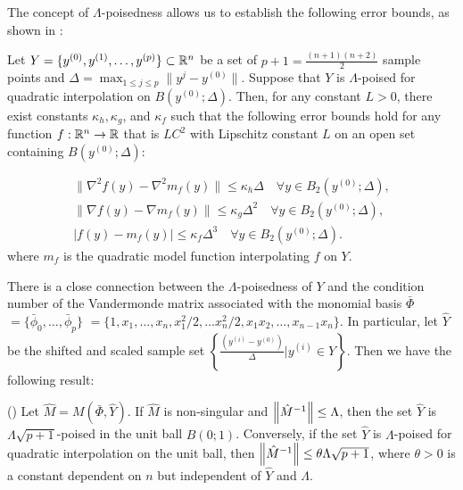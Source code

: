 The concept of $\Lambda$-poisedness allows us to establish the following error bounds, as shown in 
 \cite[Theorem 3.16]{introduction_book}:

\begin{theorem}
\label{quadratic_errors}  
Let $Y = \{y^{(0)}, y^{(1)}, \ldots, y^{(p)}\} \subset \mathbb R^n$ be a set of $p+1=\frac{(n+1)(n+2)}{2}$ sample points and $\Delta = \max_{1 \le j \le p} \|y^j-y^{(0)}\|$.  Suppose that $Y$ is $\Lambda$-poised for quadratic interpolation on $B(y^{(0)}; \Delta)$.    Then, for any constant $L > 0$, there exist constants $\kappa_{h}, \kappa_{g}$, and $\kappa_{f}$ such that the following error bounds hold for any function $f:\mathbb R^n \rightarrow \mathbb R$ that is $LC^2$ with Lipschitz constant $L$ on an open set containing $B(y^{(0)};\Delta)$:

\begin{align}
\|\nabla^2 f(y) - \nabla^2 m_f(y)\| \le \kappa_{h} \Delta \quad \forall y \in B_2(y^{(0)}; \Delta), \label{error_in_hessian}\\
\|\nabla f(y) - \nabla m_f(y)\| \le \kappa_{g} \Delta^2 \quad \forall y \in B_2(y^{(0)}; \Delta), \label{error_in_gradient} \\
|f(y) - m_f(y) | \le \kappa_{f} \Delta^3 \quad \forall y \in B_2(y^{(0)}; \Delta). \label{error_in_function} 
\end{align}
where $m_f$ is the quadratic model function interpolating $f$ on $Y$.
\end{theorem}

There is a close connection between the $\Lambda$-poisedness of $Y$ and the condition number of the Vandermonde matrix associated with the monomial basis $\bar{\Phi}$ $= \{ \bar{\phi}_0, \ldots, \bar{\phi}_p\}$ $=\{1, x_1, \ldots, x_n, x_1^2/2, \ldots x_n^2/2,x_1 x_2, \ldots, x_{n-1}x_{n}\}$.  In particular, let $\hat{Y}$ be the shifted and scaled sample set $\left\{\frac{(y^{(i)}-y^{(0)})}{\Delta}|y^{(i)} \in Y\right\}$.
Then we have the following result:

\begin{theorem}\label{Lambda_poised_error_bounds}
(\cite[Theorem 3.14]{introduction_book}) Let $\hat{M} = M(\bar{\Phi},\hat{Y})$.  
If $\hat{M}$ is  non-singular and ${\left\|\hat{M}^{-1}\right\|} \le \Lambda$,   
then the set $\hat{Y}$ is $\Lambda  \sqrt{p+1}$-poised in the unit ball $B(0;1)$.  
Conversely, if the set $\hat{Y}$ is $\Lambda$-poised for quadratic interpolation on the unit ball, 
then ${\left\|\hat{M}^{-1}\right\|} \le \theta \Lambda \sqrt{p+1}$, where $\theta > 0$ is a 
constant dependent on $n$ but independent of $\hat{Y}$ and $\Lambda$.
\end{theorem}

